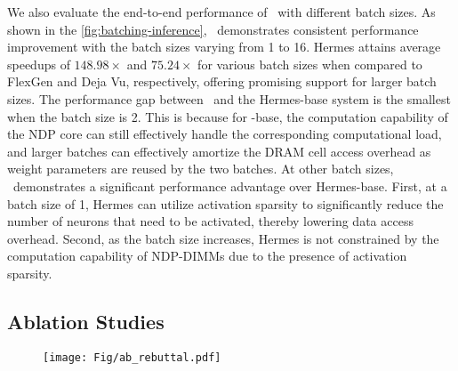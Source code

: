 We also evaluate the end-to-end performance of \name~with different batch sizes. As shown in the \fig \ref{fig:batching-inference}, \name~demonstrates consistent performance improvement with the batch sizes varying from 1 to 16. Hermes attains average speedups of $148.98\times$ and $75.24\times$ for various batch sizes when compared to FlexGen and Deja Vu, respectively, offering promising support for larger batch sizes.  The performance gap between \name~and the Hermes-base system is the smallest when the batch size is 2. This is because for \name-base, the computation capability of the NDP core can still effectively handle the corresponding computational load, and larger batches can effectively amortize the DRAM cell access overhead as weight parameters are reused by the two batches. At other batch sizes, \name~demonstrates a significant performance advantage over Hermes-base. First, at a batch size of 1, Hermes can utilize activation sparsity to significantly reduce the number of neurons that need to be activated, thereby lowering data access overhead. Second, as the batch size increases, Hermes is not constrained by the computation capability of NDP-DIMMs due to the presence of activation sparsity. 

\subsection{Ablation Studies}\label{sec:ablation-study}


\begin{figure}
    \centering
    \texttt{[image: Fig/ab\_rebuttal.pdf]}
    \vspace{-0.3cm}
    \caption{}
    \label{fig:ablation-study}
\vspace{-0.3cm}
\end{figure}



